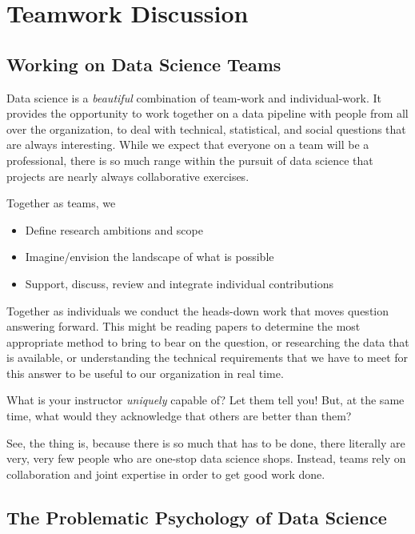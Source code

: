 \documentclass[
  letterpaper,
  DIV=11,
  numbers=noendperiod]{scrreprt}
\providecommand{\tightlist}{%
  \setlength{\itemsep}{0pt}\setlength{\parskip}{0pt}}\usepackage{longtable,booktabs,array}
\begin{document}
\section{Teamwork Discussion}\label{teamwork-discussion}

\subsection{Working on Data Science
Teams}\label{working-on-data-science-teams}

Data science is a \emph{beautiful} combination of team-work and
individual-work. It provides the opportunity to work together on a data
pipeline with people from all over the organization, to deal with
technical, statistical, and social questions that are always
interesting. While we expect that everyone on a team will be a
professional, there is so much range within the pursuit of data science
that projects are nearly always collaborative exercises.

Together as teams, we

\begin{itemize}
\tightlist
\item
  Define research ambitions and scope
\item
  Imagine/envision the landscape of what is possible
\item
  Support, discuss, review and integrate individual contributions
\end{itemize}

Together as individuals we conduct the heads-down work that moves
question answering forward. This might be reading papers to determine
the most appropriate method to bring to bear on the question, or
researching the data that is available, or understanding the technical
requirements that we have to meet for this answer to be useful to our
organization in real time.

What is your instructor \emph{uniquely} capable of? Let them tell you!
But, at the same time, what would they acknowledge that others are
better than them?

See, the thing is, because there is so much that has to be done, there
literally are very, very few people who are one-stop data science shops.
Instead, teams rely on collaboration and joint expertise in order to get
good work done.

\subsection{The Problematic Psychology of Data
Science}\label{the-problematic-psychology-of-data-science}
\end{document}
